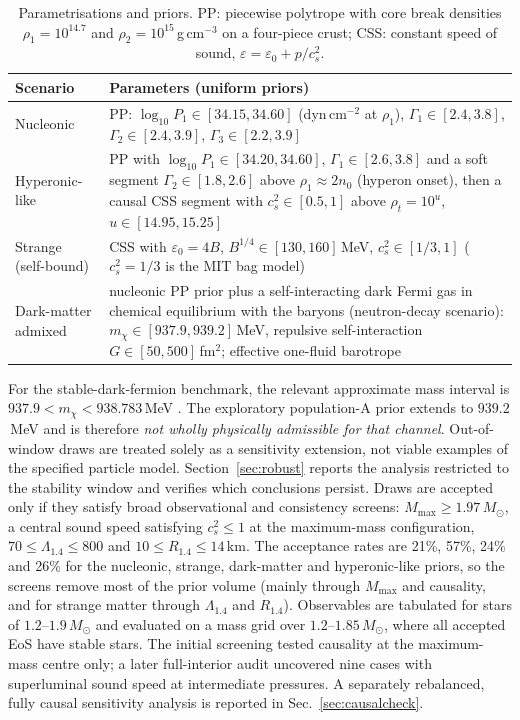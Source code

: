 \documentclass[11pt,a4paper]{article}
\newcommand{\Msun}{M_\odot}
\begin{document}
\begin{table}[t]\centering\small
\caption{Parametrisations and priors. PP: piecewise polytrope \citep{Read09} with core break densities $\rho_1=10^{14.7}$ and $\rho_2=10^{15}$\,g\,cm$^{-3}$ on a four-piece crust; CSS: constant speed of sound, $\varepsilon=\varepsilon_0+p/c_s^2$.}\label{tab:priors}
\begin{tabular}{>{\raggedright\arraybackslash}p{}p{}}\toprule
Scenario & Parameters (uniform priors)\\\midrule
Nucleonic & PP: $\log_{10}P_1\in[34.15,34.60]$ (dyn\,cm$^{-2}$ at $\rho_1$), $\Gamma_1\in[2.4,3.8]$, $\Gamma_2\in[2.4,3.9]$, $\Gamma_3\in[2.2,3.9]$\\
Hyperonic-like & PP with $\log_{10}P_1\in[34.20,34.60]$, $\Gamma_1\in[2.6,3.8]$ and a soft segment $\Gamma_2\in[1.8,2.6]$ above $\rho_1\approx2n_0$ (hyperon onset), then a causal CSS segment with $c_s^2\in[0.5,1]$ above $\rho_t=10^{u}$, $u\in[14.95,15.25]$\\
Strange (self-bound) & CSS with $\varepsilon_0=4B$, $B^{1/4}\in[130,160]$\,MeV, $c_s^2\in[1/3,1]$ ($c_s^2=1/3$ is the MIT bag model)\\
Dark-matter admixed & nucleonic PP prior plus a self-interacting dark Fermi gas in chemical equilibrium with the baryons (neutron-decay scenario): $m_\chi\in[937.9,939.2]$\,MeV, repulsive self-interaction $G\in[50,500]$\,fm$^2$; effective one-fluid barotrope\\\bottomrule\end{tabular}\end{table}
For the stable-dark-fermion benchmark, the relevant approximate mass interval is $937.9<m_\chi<938.783$\,MeV \citep{FG18}. The exploratory population-A prior extends to $939.2$\,MeV and is therefore \emph{not wholly physically admissible for that channel}. Out-of-window draws are treated solely as a sensitivity extension, not viable examples of the specified particle model. Section~\ref{sec:robust} reports the analysis restricted to the stability window and verifies which conclusions persist.
Draws are accepted only if they satisfy broad observational and consistency screens: $M_{\max}\ge1.97\,\Msun$, a central sound speed satisfying $c_s^2\le1$ at the maximum-mass configuration, $70\le\Lambda_{1.4}\le800$ and $10\le R_{1.4}\le14$\,km. The acceptance rates are 21\%, 57\%, 24\% and 26\% for the nucleonic, strange, dark-matter and hyperonic-like priors, so the screens remove most of the prior volume (mainly through $M_{\max}$ and causality, and for strange matter through $\Lambda_{1.4}$ and $R_{1.4}$). Observables are tabulated for stars of $1.2$--$1.9\,\Msun$ and evaluated on a mass grid over $1.2$--$1.85\,\Msun$, where all accepted EoS have stable stars. The initial screening tested causality at the maximum-mass centre only; a later full-interior audit uncovered nine cases with superluminal sound speed at intermediate pressures. A separately rebalanced, fully causal sensitivity analysis is reported in Sec.~\ref{sec:causalcheck}.
\end{document}
